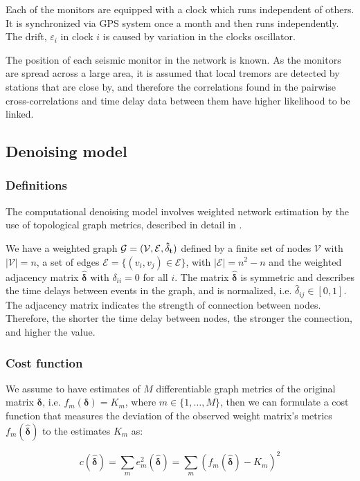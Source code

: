 \documentclass[12pt,a4paper,english]{article}
\begin{document}
Each of the monitors are equipped with a clock which runs independent of others. It is synchronized via GPS system once a month and then runs independently. The drift, $\varepsilon_i$ in clock $i$ is caused by variation in the clocks oscillator.  

The position of each seismic monitor in the network is known. As the monitors are spread across a large area, it is assumed that local tremors are detected by stations that are close by, and therefore the correlations found in the pairwise cross-correlations and time delay data between them have higher likelihood to be linked. 

\subsection{Denoising model}\label{sec:denoising}
\subsubsection{Definitions}
The computational denoising model involves weighted network estimation by the use of topological graph metrics, described in detail in \cite{Spyrou2017}. 

We have a weighted graph $\mathcal{G} = (\mathcal{V}, \mathcal{E}, \bf{\hat{\delta}}_t)$ defined by a finite set of nodes $\mathcal{V}$ with $|\mathcal{V}| = n$, a set of edges $\mathcal{E} = \{ (v_i,v_j) \in \mathcal{E} \}$, with $|\mathcal{E}| = n^2-n$ and the weighted adjacency matrix $\bm{\hat{\delta}}$ with $\delta_{ii} = 0$ for all $i$. The matrix $\bm{\hat{\delta}}$  is symmetric and describes the time delays between events in the graph, and is normalized, i.e. $\hat{\delta}_{ij}\in [0,1]$. The adjacency matrix indicates the strength of connection between nodes. Therefore, the shorter the time delay between nodes, the stronger the connection, and higher the value. 

\subsubsection{Cost function}
We assume to have estimates of $M$ differentiable graph metrics of the original matrix $\bm{\delta}$, i.e. $f_m(\bm{\delta}) = K_m$, where $m\in\{ 1,\dots, M \}$, then we can formulate a cost function that measures the deviation of the observed weight matrix's metrics $f_m(\bm{\hat{\delta}})$ to the estimates $K_m$ as: 

\begin{equation}
c(\bm{\hat{\delta}}) = \sum_m e_m^2(\bm{\hat{\delta}}) = \sum_m(f_m(\bm{\hat{\delta}})-K_m)^2
\end{equation}
\end{document}
